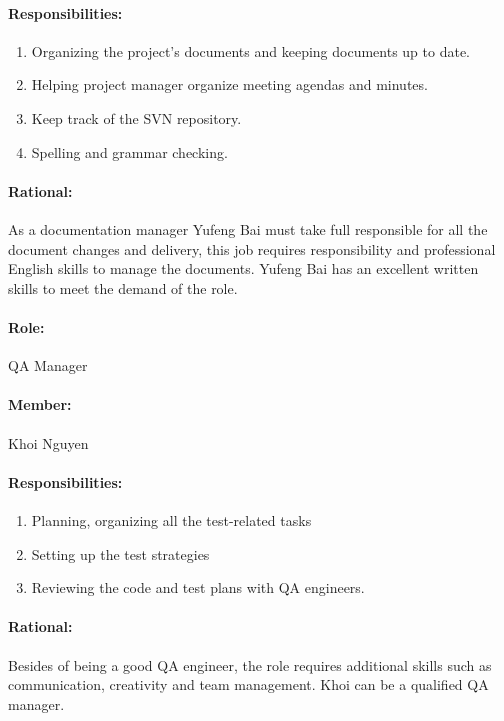 \documentclass[11pt, a4paper]{report}
\begin{document}
\paragraph{Responsibilities: }
\begin{enumerate}
	\item  Organizing the project's documents and keeping documents up to date.
	\item  Helping project manager organize meeting agendas and minutes.
	\item  Keep track of the SVN repository.
	\item  Spelling and grammar checking.
\end{enumerate}
\paragraph{Rational: \\}
As a documentation manager Yufeng Bai must take full responsible for all the document changes and delivery, this job requires responsibility and professional English skills to manage the documents. Yufeng Bai has an excellent written skills to meet the demand of the role.

\paragraph{Role: } QA Manager
\paragraph{Member: } Khoi Nguyen
\paragraph{Responsibilities: }
\begin{enumerate}
	\item  Planning, organizing all the test-related tasks
	\item  Setting up the test strategies
	\item  Reviewing the code and test plans with QA engineers.
\end{enumerate}
\paragraph{Rational: \\}
Besides of being a good QA engineer, the role requires additional skills such as communication, creativity and team management. Khoi can be a qualified QA manager.
\end{document}
